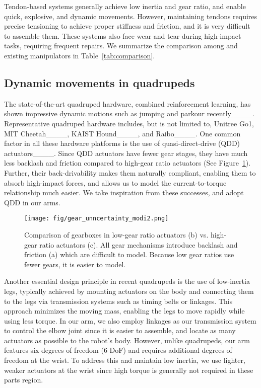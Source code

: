 Tendon-based systems generally achieve low inertia and gear ratio, and enable quick, explosive, and dynamic movements. However, maintaining tendons requires precise tensioning to achieve proper stiffness and friction, and it is very difficult to assemble them. These systems also face wear and tear during high-impact tasks, requiring frequent repairs. We summarize the comparison among \robot and existing manipulators in Table~\ref{tab:comparison}.



\subsection{Dynamic movements in quadrupeds}
The state-of-the-art quadruped hardware, combined reinforcement learning, has shown impressive dynamic motions such as jumping and parkour recently____. Representative quadruped hardware includes, but is not limited to, Unitree Go1, MIT Cheetah____, KAIST Hound____, and Raibo____.
One common factor in all these hardware platforms is the use of quasi-direct-drive (QDD) actuators____. Since QDD actuators 
have fewer gear stages, they have much less backlash and friction compared to high-gear ratio actuators (See Figure~\ref{fig:gear_uncertainty}). Further, their back-drivability makes them naturally compliant, enabling them to absorb high-impact forces, and allows us to model the current-to-torque relationship much easier. We take inspiration from these successes, and adopt QDD in our arms.


\begin{figure}[ht]
\centering
\texttt{[image: fig/gear\_unncertainty\_modi2.png]}
\caption{Comparison of gearboxes in low-gear ratio actuators (b) vs. high-gear ratio actuators (c).  All gear mechanisms introduce backlash and friction (a) which are difficult to model. Because low gear ratios use fewer gears, it is easier to model.}
\label{fig:gear_uncertainty}
\end{figure}

Another essential design principle in recent quadrupeds is the use of low-inertia legs, typically achieved by mounting actuators on the body and connecting them to the legs via transmission systems such as timing belts or linkages. This approach minimizes the moving mass, enabling the legs to move rapidly while using less torque. In our arm, we also employ linkages as our transmission system to control the elbow joint since it is easier to assemble, and locate as many actuators as possible to the robot's body. However, unlike quadrupeds, our arm features six degrees of freedom (6 DoF) and requires additional degrees of freedom at the wrist. To address this and maintain low inertia, we use lighter, weaker actuators at the wrist since high torque is generally not required in these parts region.


